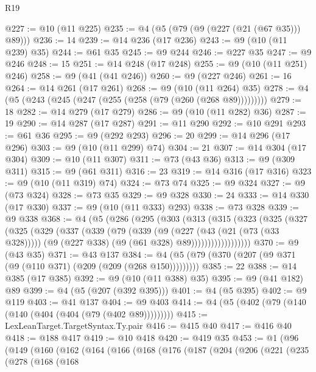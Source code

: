 \begin{lexlean}{R19}
\begin{coremodule}
@227 := @10 (@11 @225)
@235 := @4 (@5 (@79 (@9 (@227 (@21 (@67 @35))) @89)))
@236 := 14
@239 := @14 @236 (@17 @236)
@243 := @9 (@10 (@11 @239) @35)
@244 := @61 @35
@245 := @9 @244
@246 := @227 @35
@247 := @9 @246
@248 := 15
@251 := @14 @248 (@17 @248)
@255 := @9 (@10 (@11 @251) @246)
@258 := @9 (@41 (@41 @246))
@260 := @9 (@227 @246)
@261 := 16
@264 := @14 @261 (@17 @261)
@268 := @9 (@10 (@11 @264) @35)
@278 := @4 (@5 (@243 (@245 (@247 (@255 (@258 (@79 (@260 (@268 @89)))))))))
@279 := 18
@282 := @14 @279 (@17 @279)
@286 := @9 (@10 (@11 @282) @36)
@287 := 19
@290 := @14 @287 (@17 @287)
@291 := @11 @290
@292 := @10 @291
@293 := @61 @36
@295 := @9 (@292 @293)
@296 := 20
@299 := @14 @296 (@17 @296)
@303 := @9 (@10 (@11 @299) @74)
@304 := 21
@307 := @14 @304 (@17 @304)
@309 := @10 (@11 @307)
@311 := @73 (@43 @36)
@313 := @9 (@309 @311)
@315 := @9 (@61 @311)
@316 := 23
@319 := @14 @316 (@17 @316)
@323 := @9 (@10 (@11 @319) @74)
@324 := @73 @74
@325 := @9 @324
@327 := @9 (@73 @324)
@328 := @73 @35
@329 := @9 @328
@330 := 24
@333 := @14 @330 (@17 @330)
@337 := @9 (@10 (@11 @333) @293)
@338 := @73 @328
@339 := @9 @338
@368 := @4
    (@5
      (@286
        (@295
          (@303
            (@313
              (@315
                (@323
                  (@325
                    (@327
                      (@325
                        (@329
                          (@337
                            (@339
                              (@79
                                (@339
                                  (@9
                                    (@227 (@43 (@21 (@73 (@33 @328)))))
                                    (@9 (@227 @338) (@9 (@61 @328) @89))))))))))))))))))
@370 := @9 (@43 @35)
@371 := @43 @137
@384 := @4 (@5 (@79 (@370 (@207 (@9 @371 (@9 (@110 @371) (@209 (@209 (@268 @150)))))))))
@385 := 22
@388 := @14 @385 (@17 @385)
@392 := @9 (@10 (@11 @388) @35)
@395 := @9 (@41 @182) @89
@399 := @4 (@5 (@207 (@392 @395)))
@401 := @4 (@5 @395)
@402 := @9 @119
@403 := @41 @137
@404 := @9 @403
@414 := @4 (@5 (@402 (@79 (@140 (@140 (@404 (@404 (@79 (@402 @89)))))))))
@415 := LexLeanTarget.TargetSyntax.Ty.pair
@416 := @415 @40
@417 := @416 @40
@418 := @188 @417
@419 := @10 @418
@420 := @419 @35
@453 := @1
    (@96
      (@149
        (@160
          (@162
            (@164
              (@166
                (@168
                  (@176
                    (@187
                      (@204
                        (@206
                          (@221
                            (@235
                              (@278
                                (@168
                                  (@168

\end{coremodule}
\end{lexlean}
